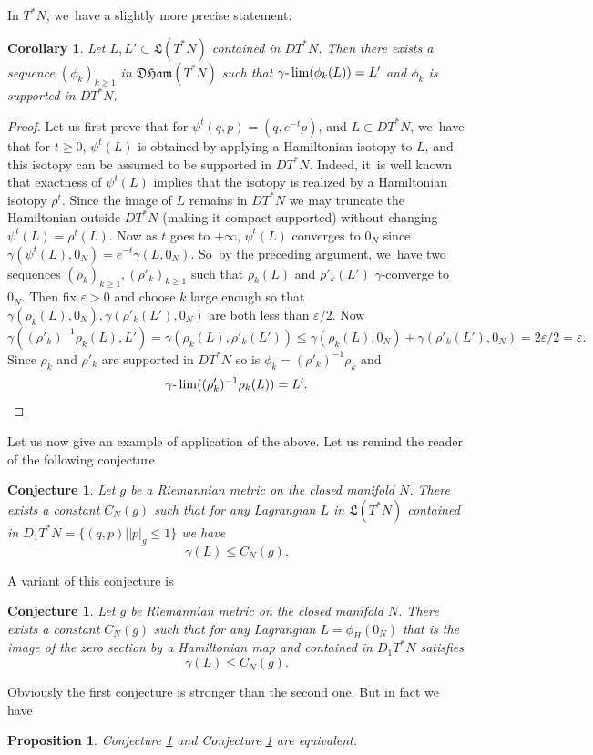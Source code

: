 \documentclass[10pt]{amsart}
\newtheorem{cor}[thm]{Corollary}
\newtheorem{prop}[thm]{Proposition}
\newtheorem{Conjecture}[thm]{Conjecture}
\theoremstyle{definition}
\newcommand{\DHam}{\mathfrak{DHam}}
\begin{document}
In $T^*N$, we~have a slightly more precise statement:
\begin{cor}\label{Weak-Nearby-with-support}
Let $L, L'\subset{\mathfrak L}(T^*N)$ contained in $DT^*N$. Then there exists a sequence $(\phi_k)_{k\geq 1}$ in $\DHam(T^*N)$ such that $\gamma\textup{-}\lim(\phi_k(L))=L'$ and $\phi_k$ is supported in $DT^*N$.
\end{cor}

\begin{proof}
Let us first prove that for $\psi^t(q,p)=(q,e^{-t}p)$, and $L\subset DT^*N$, we~have that for $t\geq 0$, $\psi^t(L)$ is obtained by applying a Hamiltonian isotopy to $L$, and this isotopy can be assumed to be supported in $DT^*N$. Indeed, it~is well known that exactness of $\psi^t(L)$ implies that the isotopy is realized by a Hamiltonian isotopy $\rho^t$. Since the image of $L$ remains in $DT^*N$ we may truncate the Hamiltonian outside $DT^*N$ (\ie making it compact supported) without changing $\psi^t(L)=\rho^t(L)$.
Now as $t$ goes to $+\infty$, $\psi^t(L)$ converges to $0_N$ since $\gamma(\psi^t(L),0_N)=e^{-t}\gamma(L,0_N)$. So~by the preceding argument, we~have two sequences $(\rho_k)_{k\geq 1}, (\rho'_k)_{k\geq 1}$ such that $\rho_k(L)$ and $\rho'_k(L')$ $\gamma$\nobreakdash-converge to $0_N$. Then fix $ \varepsilon >0$ and choose $k$ large enough so that $\gamma(\rho_k(L),0_N), \gamma(\rho'_k(L'),0_N)$ are both less than $ \varepsilon /2$. Now
\[
\gamma((\rho'_k)^{-1}\rho_k(L),L')=\gamma(\rho_k(L),\rho'_k(L'))\leq \gamma(\rho_k(L),0_N)+ \gamma(\rho'_k(L'),0_N)=2 \varepsilon /2= \varepsilon.
\]
Since $\rho_k$ and $\rho'_k$ are supported in $DT^*N$ so is $\phi_k=(\rho'_k)^{-1}\rho_k$ and
\[
\gamma\textup{-}\lim((\rho'_k)^{-1}\rho_k(L))=L'.\qedhere
\]
\end{proof}

Let us now give an example of application of the above. Let us remind the reader of the following conjecture
\begin{Conjecture}\label{Conj1} Let $g$ be a Riemannian metric on the closed manifold $N$. There exists a constant $C_N(g)$ such that for any Lagrangian $L$ in ${\mathfrak L}(T^*N)$ contained in $D_1T^*N=\{(q,p)\mid \vert p \vert_g\leq 1\}$ we have\vspace*{-3pt}
\[
\gamma(L)\leq C_N(g).
\]
\end{Conjecture}
A variant of this conjecture is
\begin{Conjecture}\label{Conj2} Let $g$ be Riemannian metric on the closed manifold $N$. There exists a constant $C_N(g)$ such that for any Lagrangian $L=\phi_H(0_N)$ that is the image of the zero section by a Hamiltonian map and contained in $D_1T^*N$ satisfies\vspace*{-3pt}\enlargethispage{\baselineskip}
\[
\gamma(L)\leq C_N(g).
\]
\end{Conjecture}
Obviously the first conjecture is stronger than the second one. But in fact we have
\begin{prop}
Conjecture \ref{Conj1} and Conjecture \ref{Conj2} are equivalent.
\end{prop}
\end{document}
